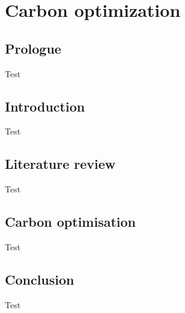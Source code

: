\chapter{Carbon optimization}
\label{chapter:carbon}
\ifpdf
    \graphicspath{{Chapter3/Figs/Raster/}{Chapter3/Figs/PDF/}{Chapter3/Figs/}}
\else
    \graphicspath{{Chapter3/Figs/Vector/}{Chapter3/Figs/}}
\fi



\section*{Prologue}

Test

\section{Introduction}

Test

\section{Literature review}

Test

\section{Carbon optimisation}

Test

\section{Conclusion}


Test







